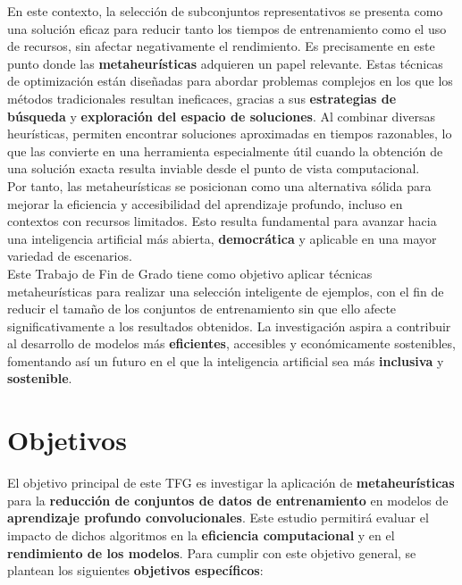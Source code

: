 En este contexto, la selección de subconjuntos representativos se presenta como una solución eficaz para reducir tanto
los tiempos de entrenamiento como el uso de recursos, sin afectar negativamente el rendimiento.
Es precisamente en este punto donde las \textbf{metaheurísticas} adquieren un papel relevante.
Estas técnicas de optimización están diseñadas para abordar problemas complejos en los que los métodos tradicionales
resultan ineficaces, gracias a sus \textbf{estrategias de búsqueda} y \textbf{exploración del espacio de soluciones}.
Al combinar diversas heurísticas, permiten encontrar soluciones aproximadas en tiempos razonables, lo que las convierte
en una herramienta especialmente útil cuando la obtención de una solución exacta resulta inviable desde el punto de
vista computacional. \\[6pt]

Por tanto, las metaheurísticas se posicionan como una alternativa sólida para mejorar la eficiencia y accesibilidad del
aprendizaje profundo, incluso en contextos con recursos limitados.
Esto resulta fundamental para avanzar hacia una inteligencia artificial más abierta, \textbf{democrática} y aplicable
en una mayor variedad de escenarios. \\[6pt]


Este Trabajo de Fin de Grado tiene como objetivo aplicar técnicas metaheurísticas para realizar una selección
inteligente de ejemplos, con el fin de reducir el tamaño de los conjuntos de entrenamiento sin que ello afecte
significativamente a los resultados obtenidos.
La investigación aspira a contribuir al desarrollo de modelos más \textbf{eficientes}, accesibles y económicamente
sostenibles, fomentando así un futuro en el que la inteligencia artificial sea más \textbf{inclusiva} y
\textbf{sostenible}. \\[6pt]

\section{Objetivos}\label{sec:objetivos}
El objetivo principal de este TFG es investigar la aplicación de \textbf{metaheurísticas} para la
\textbf{reducción de conjuntos de datos de entrenamiento} en modelos de \textbf{aprendizaje profundo convolucionales}.
Este estudio permitirá evaluar el impacto de dichos algoritmos en la \textbf{eficiencia computacional} y en el
\textbf{rendimiento de los modelos}.
Para cumplir con este objetivo general, se plantean los siguientes \textbf{objetivos específicos}:

